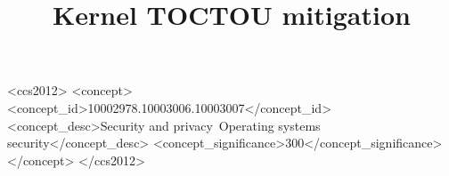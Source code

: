 \documentclass[sigconf, anonymous]{acmart}
\begin{document}
\sloppy

\title{Kernel TOCTOU mitigation}

\maketitle



\begin{CCSXML}
<ccs2012>
<concept>
<concept_id>10002978.10003006.10003007</concept_id>
<concept_desc>Security and privacy~Operating systems security</concept_desc>
<concept_significance>300</concept_significance>
</concept>
</ccs2012>
\end{CCSXML}














  
\end{document}
